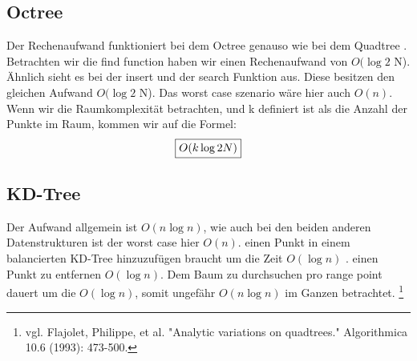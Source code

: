 \documentclass[11pt]{article}
\newcommand{\qt}{Quadtree }
\newcommand{\oc}{Octree }
\newcommand{\kd}{KD-Tree }
\begin{document}
\subsection{\oc}

Der Rechenaufwand funktioniert bei dem \oc genauso wie bei dem \qt . 
Betrachten wir die find function haben wir einen Rechenaufwand von $O(\log2 $ N). 
Ähnlich sieht es bei der insert und der search Funktion aus. Diese besitzen den gleichen Aufwand $O(\log2 $ N).
Das worst case szenario wäre hier auch $O(n)$. 
Wenn wir die Raumkomplexität betrachten, und k definiert ist als die Anzahl der Punkte im Raum, kommen wir auf die Formel:
\begin{equation*}
    \fbox{$O(k \log2 N) $}  
\end{equation*}

\subsection{\kd}

Der Aufwand allgemein ist $O(n \log n)$, wie auch bei den beiden anderen Datenstrukturen ist der worst case hier $O(n)$. 
einen Punkt in einem balancierten \kd hinzuzufügen braucht um die Zeit $O(\log n)$ . einen Punkt zu entfernen $O(\log n)$. 
Dem Baum zu durchsuchen pro range point dauert um die $O(\log n)$, somit ungefähr $O(n \log n)$ im Ganzen betrachtet. \footnote[1]{vgl. Flajolet, Philippe, et al. "Analytic variations on quadtrees." Algorithmica 10.6 (1993): 473-500.}

\pagebreak
\end{document}
